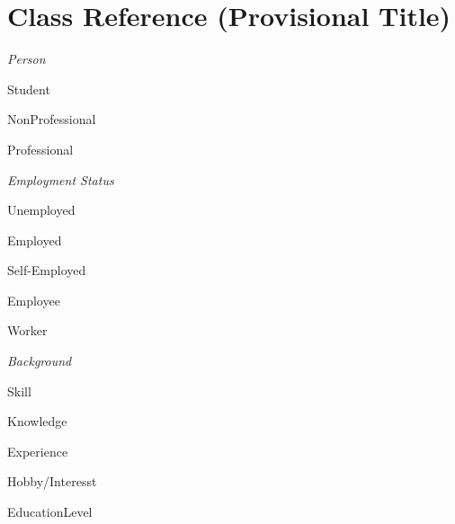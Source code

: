 \documentclass[english]{article}
\begin{document}
\section{Class Reference (Provisional Title)}


\begin{labelist}
    \item   
        \textit{Person}
        \begin{labelist}
            \item Student
            \item NonProfessional
            \item Professional
        \end{labelist}
    \item   
        \textit{Employment Status} \cite{employment_status_ref}
        \begin{labelist}
            \item Unemployed
            \item Employed
            	\begin{labelist}
                  \item Self-Employed
                  \item Employee
                  \item Worker
              \end{labelist}
        \end{labelist}
    \item   
        \textit{Background}
        \begin{labelist}
            \item Skill
            \item Knowledge
            \item Experience
            \item Hobby/Interesst \cite{hobbies_list_ref}
            \item EducationLevel
        \end{labelist}
   
\end{labelist} 

\vspace{5mm}


\end{document}
